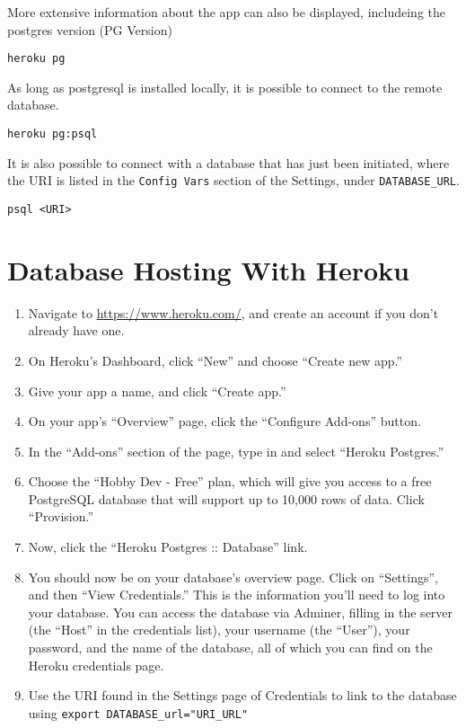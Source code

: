 \documentclass[]{book}
\providecommand{\tightlist}{%
  \setlength{\itemsep}{0pt}\setlength{\parskip}{0pt}}
\begin{document}
More extensive information about the app can also be displayed, includeing the postgres version (PG Version)

\begin{verbatim}
heroku pg
\end{verbatim}

As long as postgresql is installed locally, it is possible to connect to the remote database.

\begin{verbatim}
heroku pg:psql
\end{verbatim}

It is also possible to connect with a database that has just been initiated, where the URI is listed in the \texttt{Config\ Vars} section of the Settings, under \texttt{DATABASE\_URL}.

\begin{verbatim}
psql <URI>
\end{verbatim}

\hypertarget{database-hosting-with-heroku}{%
\section{Database Hosting With Heroku}\label{database-hosting-with-heroku}}

\begin{enumerate}
\def\labelenumi{\arabic{enumi}.}
\tightlist
\item
  Navigate to \url{https://www.heroku.com/}, and create an account if you don't already have one.
\item
  On Heroku's Dashboard, click ``New'' and choose ``Create new app.''
\item
  Give your app a name, and click ``Create app.''
\item
  On your app's ``Overview'' page, click the ``Configure Add-ons'' button.
\item
  In the ``Add-ons'' section of the page, type in and select ``Heroku Postgres.''
\item
  Choose the ``Hobby Dev - Free'' plan, which will give you access to a free PostgreSQL database that will support up to 10,000 rows of data. Click ``Provision.''
\item
  Now, click the ``Heroku Postgres :: Database'' link.
\item
  You should now be on your database's overview page. Click on ``Settings'', and then ``View Credentials.'' This is the information you'll need to log into your database. You can access the database via Adminer, filling in the server (the ``Host'' in the credentials list), your username (the ``User''), your password, and the name of the database, all of which you can find on the Heroku credentials page.
\item
  Use the URI found in the Settings page of Credentials to link to the database using \texttt{export\ DATABASE\_url="URI\_URL"}
\end{enumerate}
\end{document}
